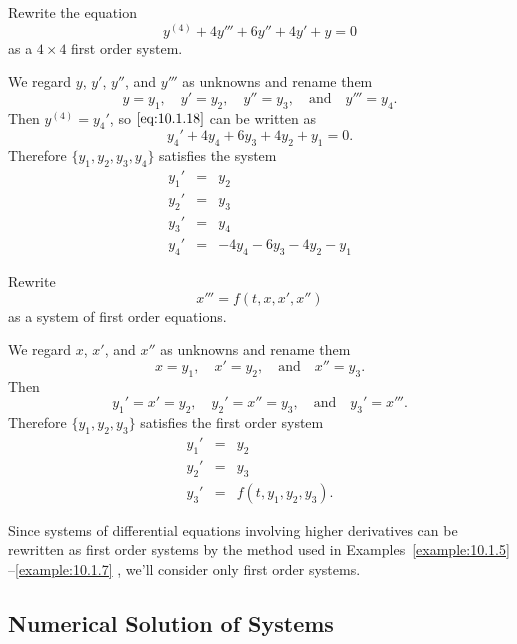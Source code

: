 \documentclass{ximera}
\begin{document}
\begin{example}\label{example:10.1.6}
Rewrite the equation
\begin{equation} \label{eq:10.1.18}
y^{(4)}+4y'''+6y''+4y'+y=0
\end{equation}
as a $4\times4$ first order system.

\begin{explanation}
We regard $y$, $y'$, $y''$, and $y'''$  as unknowns and rename them
$$
y=y_1,\quad y'=y_2,\quad y''=y_3,\quad\mbox{and}\quad y'''=y_4.
$$
Then $y^{(4)}=y_4'$, so $\eqref{eq:10.1.18}$ can be written as
$$
y_4'+4y_4+6y_3+4y_2+y_1=0.
$$
Therefore $\{y_1,y_2,y_3,y_4\}$ satisfies the system
 \begin{eqnarray*}
y_1'&=&y_2\\
y_2'&=&y_3 \\
y_3'&=&y_4\\
y_4'&=&-4y_4-6y_3-4y_2-y_1
\end{eqnarray*}
\end{explanation}
\end{example}

\begin{example}\label{example:10.1.7}
 Rewrite
$$
x'''=f(t,x,x',x'')
$$
as a system of first order equations.

\begin{explanation}
We regard $x$, $x'$, and $x''$ as unknowns and rename them
$$
x=y_1, \quad x'=y_2,\quad\mbox{and}\quad x''=y_3.
$$
Then
$$
y_1'=x'=y_2,\quad y_2'=x''=y_3,\quad\mbox{and}\quad y_3'=x'''.
$$
Therefore $\{y_1,y_2,y_3\}$ satisfies the first order system
$$
\begin{array}{ccl}
y_1'&=&y_2\\
y_2'&=&y_3\\
y_3'&=&f(t,y_1,y_2,y_3).
\end{array}
$$
\end{explanation}
\end{example}

Since systems of differential equations involving higher derivatives
can be rewritten as first order systems by the method used in
Examples~\ref{example:10.1.5} --\ref{example:10.1.7} , we'll consider only first
order systems.

\subsection*{Numerical Solution of Systems}
\end{document}
